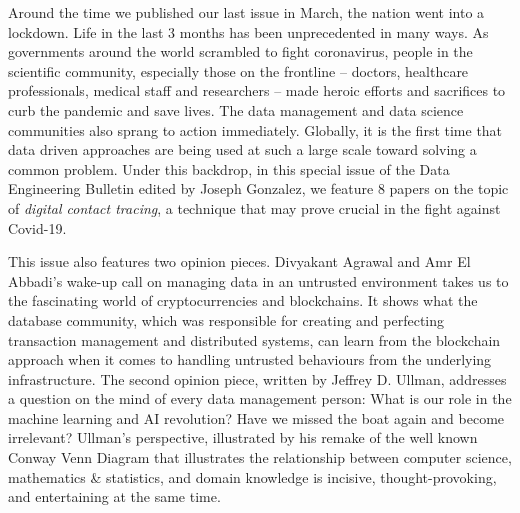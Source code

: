 \documentclass[11pt]{article}
\begin{document}
Around the time we published our last issue in March, the nation went
into a lockdown. Life in the last 3 months has been unprecedented in
many ways. As governments around the world scrambled to fight
coronavirus, people in the scientific community, especially those on
the frontline -- doctors, healthcare professionals, medical staff and
researchers -- made heroic efforts and sacrifices to curb the pandemic
and save lives. The data management and data science communities also
sprang to action immediately. Globally, it is the first time that data
driven approaches are being used at such a large scale toward solving
a common problem. Under this backdrop, in this special issue of the
Data Engineering Bulletin edited by Joseph Gonzalez, we feature 8
papers on the topic of {\it digital contact tracing}, a technique that
may prove crucial in the fight against Covid-19.

This issue also features two opinion pieces. Divyakant Agrawal and Amr
El Abbadi's wake-up call on managing data in an untrusted environment
takes us to the fascinating world of cryptocurrencies and
blockchains. It shows what the database community, which was
responsible for creating and perfecting transaction management and
distributed systems, can learn from the blockchain approach when it
comes to handling untrusted behaviours from the underlying
infrastructure. The second opinion piece, written by Jeffrey
D. Ullman, addresses a question on the mind of every data management
person: What is our role in the machine learning and AI revolution?
Have we missed the boat again and become irrelevant? Ullman's
perspective, illustrated by his remake of the well known Conway Venn
Diagram that illustrates the relationship between computer science,
mathematics \& statistics, and domain knowledge is incisive,
thought-provoking, and entertaining at the same time.
\end{document}
